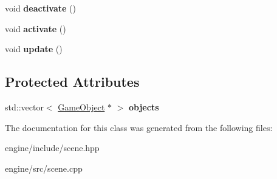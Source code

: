 \begin{DoxyCompactItemize}
\item 
void {\bfseries deactivate} ()\hypertarget{classengine_1_1_scene_ad8fa30fc96100daf9f028922bb435daa}{}\label{classengine_1_1_scene_ad8fa30fc96100daf9f028922bb435daa}

\item 
void {\bfseries activate} ()\hypertarget{classengine_1_1_scene_adf671a288f878e3efa42ccbf34b0d6ed}{}\label{classengine_1_1_scene_adf671a288f878e3efa42ccbf34b0d6ed}

\item 
void {\bfseries update} ()\hypertarget{classengine_1_1_scene_aa24c7e636c10e4e42650c1374b90bb80}{}\label{classengine_1_1_scene_aa24c7e636c10e4e42650c1374b90bb80}

\end{DoxyCompactItemize}
\subsection*{Protected Attributes}
\begin{DoxyCompactItemize}
\item 
std\+::vector$<$ \hyperlink{classengine_1_1_game_object}{Game\+Object} $\ast$ $>$ {\bfseries objects}\hypertarget{classengine_1_1_scene_a96bc55879afea7cb0086df8172b3bc09}{}\label{classengine_1_1_scene_a96bc55879afea7cb0086df8172b3bc09}

\end{DoxyCompactItemize}


The documentation for this class was generated from the following files\+:\begin{DoxyCompactItemize}
\item 
engine/include/scene.\+hpp\item 
engine/src/scene.\+cpp\end{DoxyCompactItemize}
